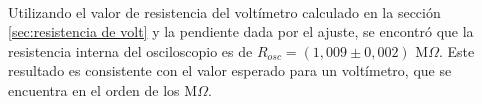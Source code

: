 \paragraph{}
Utilizando el valor de resistencia del voltímetro calculado en la sección \ref{sec:resistencia de volt} y la pendiente dada por el ajuste, se encontró que la resistencia interna del osciloscopio es de  $R_{osc}=(1,009 \pm 0,002)$ M$\Omega$. Este resultado es consistente con el valor esperado para un voltímetro, que se encuentra en el orden de los M$\Omega$.
